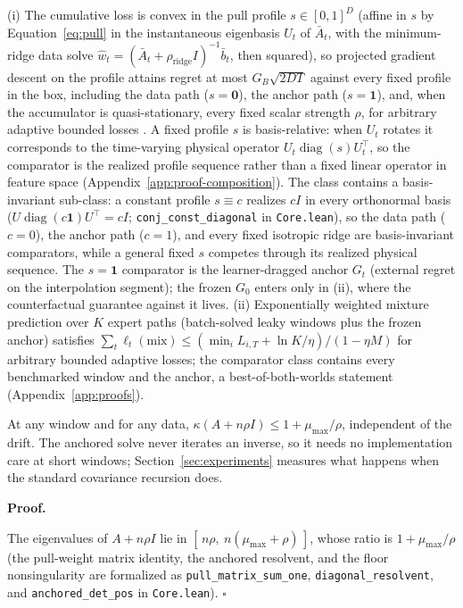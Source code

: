 \documentclass[twoside,11pt]{article}
\renewenvironment{proof}[1][Proof]{%
  \par\noindent\textbf{#1.}\hspace{0.4em}\ignorespaces
}{%
  \hfill\ensuremath{\square}\par\medskip
}
\begin{document}
\begin{proposition}
\label{prop:ocowrap}
(i) The cumulative loss is convex in the pull profile $s \in [0,1]^D$ (affine in $s$ by Equation~\eqref{eq:pull} in the instantaneous eigenbasis $U_t$ of $\bar A_t$, with the minimum-ridge data solve $\widehat w_t = (\bar A_t + \rho_{\mathrm{ridge}}I)^{-1}\bar b_t$, then squared), so projected gradient descent on the profile attains regret at most $G_B\sqrt{2DT}$ against every fixed profile in the box, including the data path ($s = \mathbf 0$), the anchor path ($s = \mathbf 1$), and, when the accumulator is quasi-stationary, every fixed scalar strength $\rho$, for arbitrary adaptive bounded losses \citep{zinkevich2003}.
A fixed profile $s$ is basis-relative: when $U_t$ rotates it corresponds to the time-varying physical operator $U_t\operatorname{diag}(s)U_t^\top$, so the comparator is the realized profile sequence rather than a fixed linear operator in feature space (Appendix~\ref{app:proof-composition}). The class contains a basis-invariant sub-class: a constant profile $s \equiv c$ realizes $cI$ in every orthonormal basis ($U\operatorname{diag}(c\mathbf 1)U^\top = cI$; \texttt{conj\_const\_diagonal} in \texttt{Core.lean}), so the data path ($c=0$), the anchor path ($c=1$), and every fixed isotropic ridge are basis-invariant comparators, while a general fixed $s$ competes through its realized physical sequence.
The $s = \mathbf 1$ comparator is the learner-dragged anchor $G_t$ (external regret on the interpolation segment); the frozen $G_0$ enters only in (ii), where the counterfactual guarantee against it lives.
(ii) Exponentially weighted mixture prediction over $K$ expert paths (batch-solved leaky windows plus the frozen anchor) satisfies $\sum_t \ell_t(\mathrm{mix}) \le (\min_i L_{i,T} + \ln K/\eta)/(1 - \eta M)$ for arbitrary bounded adaptive losses; the comparator class contains every benchmarked window and the anchor, a best-of-both-worlds statement (Appendix~\ref{app:proofs}).
\end{proposition}

\begin{proposition}
\label{prop:windup}
At any window and for any data, $\kappa(A + n\rho I) \le 1 + \mu_{\max}/\rho$, independent of the drift.
The anchored solve never iterates an inverse, so it needs no implementation care at short windows; Section~\ref{sec:experiments} measures what happens when the standard covariance recursion does.
\end{proposition}
\begin{proof}
The eigenvalues of $A + n\rho I$ lie in $[\,n\rho,\ n(\mu_{\max} + \rho)\,]$, whose ratio is $1 + \mu_{\max}/\rho$ (the pull-weight matrix identity, the anchored resolvent, and the floor nonsingularity are formalized as \texttt{pull\_matrix\_sum\_one}, \texttt{diagonal\_resolvent}, and \texttt{anchored\_det\_pos} in \texttt{Core.lean}).
\end{proof}
\end{document}
